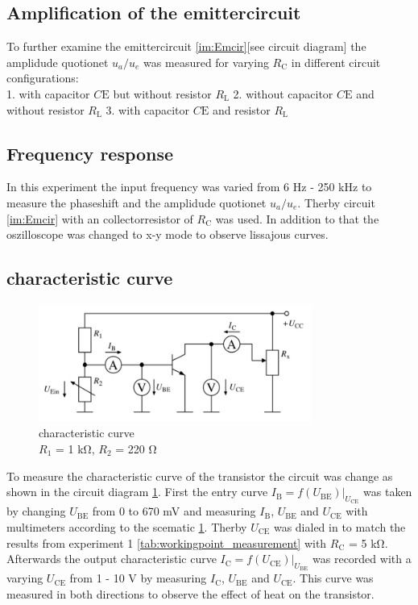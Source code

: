 \documentclass[11pt, a4paper]{article}
\begin{document}
\subsection{Amplification of the emittercircuit}
To further examine the emittercircuit \ref{im:Emcir}[see circuit diagram] the amplidude quotionet $u_a / u_e$ was measured for varying $R_{\text{C}}$ in different circuit configurations:\\
1. with capacitor $C{\text{E}}$ but without resistor $R_{\text{L}}$
2. without capacitor $C{\text{E}}$ and without resistor $R_{\text{L}}$
3. with capacitor $C{\text{E}}$ and resistor $R_{\text{L}}$
\subsection{Frequency response}
In this experiment the input frequency was varied from 6 \si{\hertz} - 250 \si{\kilo\hertz} to measure the phaseshift and the amplidude quotionet $u_a / u_e$. 
Therby circuit \ref{im:Emcir} with an collectorresistor of $R_{\text{C}}$ was used. In addition to that the oszilloscope was changed to x-y mode to observe lissajous curves.
\subsection{characteristic curve}
\begin{figure}[h]
    \centering
    \includegraphics[width=0.8\textwidth]{bilder/characteristicCurve.png}
    \caption{characteristic curve \\
    $R_1$ = 1 \si{\kilo\ohm}, $R_2$ = 220 \si{\ohm}}
    \label{im:Charcurcir}
\end{figure}

To measure the characteristic curve of the transistor the circuit was change as shown in the circuit diagram \ref{im:Charcurcir}. 
First the entry curve $I_{\text{B}}=f(U_{\text{BE}})|_{U_{\text{CE}}}$ was taken by changing $U_{\text{BE}}$ from 0 to 670 \si{\milli\volt} and measuring $I_{\text{B}}$,
$U_{\text{BE}}$ and $U_{\text{CE}}$ with multimeters according to the scematic \ref{im:Charcurcir}. Therby $U_{\text{CE}}$ was dialed in to match the results from experiment 1 \ref{tab:workingpoint_measurement} with $R_{\text{C}}$ = 5 \si{\kilo\ohm}.
Afterwards the output characteristic curve $I_{\text{C}} = f(U_{\text{CE}})|_{U_{\text{BE}}}$ was recorded with a varying $U_{\text{CE}}$ from 1 - 10 \si{\volt} by measuring $I_{\text{C}}$, $U_{\text{BE}}$ and $U_{\text{CE}}$. This curve was measured in both directions to observe the effect of heat on the transistor.
\end{document}

